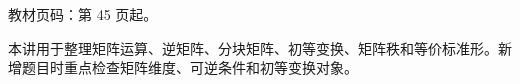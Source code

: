 
\begin{knowledgeBox}
教材页码：第 45 页起。

本讲用于整理矩阵运算、逆矩阵、分块矩阵、初等变换、矩阵秩和等价标准形。新增题目时重点检查矩阵维度、可逆条件和初等变换对象。
\end{knowledgeBox}
